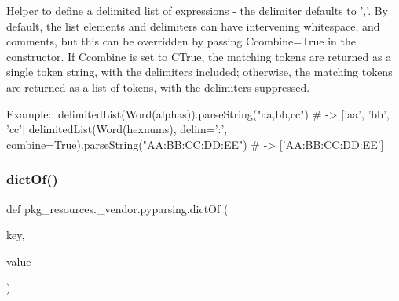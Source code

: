 \begin{DoxyVerb}Helper to define a delimited list of expressions - the delimiter defaults to ','.
By default, the list elements and delimiters can have intervening whitespace, and
comments, but this can be overridden by passing C{combine=True} in the constructor.
If C{combine} is set to C{True}, the matching tokens are returned as a single token
string, with the delimiters included; otherwise, the matching tokens are returned
as a list of tokens, with the delimiters suppressed.

Example::
    delimitedList(Word(alphas)).parseString("aa,bb,cc") # -> ['aa', 'bb', 'cc']
    delimitedList(Word(hexnums), delim=':', combine=True).parseString("AA:BB:CC:DD:EE") # -> ['AA:BB:CC:DD:EE']
\end{DoxyVerb}
 \mbox{\label{namespacepkg__resources_1_1__vendor_1_1pyparsing_a05a87efe0ddbc7738ba7ad4151bca0c4}} 
\subsubsection{\texorpdfstring{dict\+Of()}{dictOf()}}
{\footnotesize\ttfamily def pkg\+\_\+resources.\+\_\+vendor.\+pyparsing.\+dict\+Of (\begin{DoxyParamCaption}\item[{}]{key,  }\item[{}]{value }\end{DoxyParamCaption})}

